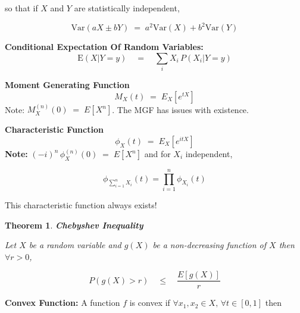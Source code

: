 \documentclass[10pt]{article}
\newtheorem{theorem}{Theorem}
\numberwithin{equation}{section}
\begin{document}
\noindent
so that if $X$ and $Y$ are statistically independent,

$$ \text{Var}(aX \pm  bY ) \; = \; a^{2} \text{Var}(X) + b^{2}\text{Var}(Y) $$

\vspace{2mm}

\noindent
\textbf{Conditional Expectation Of Random Variables:}
\begin{equation}
\text{E}(X \vert Y =y  ) \quad = \quad \sum_{i} X_{i} \, P(X_{i} | Y = y ) 
\end{equation} 

\vspace{2mm}

\noindent
\textbf{Moment Generating Function}
\begin{equation}
M_{X}(t) \; = \; E_{X}[e^{tX}] 
\end{equation}
\noindent 
Note: $M_{X}^{(n)}(0) \; = \; E[X^{n}]$. The MGF has issues with existence.

\vspace{2mm}

\noindent
\textbf{Characteristic Function}
\begin{equation}
\phi_{X}(t) \; = \; E_{X}[e^{itX}] 
\end{equation}
\noindent 
\textbf{Note:} $(-i)^{n} \, \phi_{X}^{(n)}(0) \; = \; E[X^{n}]$ and  for $X_{i}$ independent,

$$ \phi_{\sum_{i=1}^{n} X_{i} } (t) = \prod_{i=1}^{n} \phi_{X_{i}}(t)$$


\noindent
This characteristic function always exists!

\vspace{2mm}

\noindent
\begin{theorem} \textbf{Chebyshev Inequality}

Let $X$ be a random variable and $g(X)$ be a non-decreasing function of $X$ then $\forall r > 0$,

\begin{equation}
P\left(g(X) > r \right) \quad \leq \quad \frac{E[g(X)]}{r}
\end{equation}

\end{theorem}

\vspace{2mm}

\noindent
\textbf{Convex Function: } A function $f$ is convex if $\forall x_{1}, x_{2} \in X, \,  \forall t \in [0,1]$ then 
\end{document}
